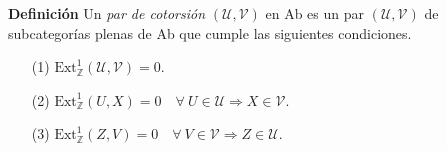 \documentclass[preview]{standalone}
\begin{document}
\begin{center}
\justifying \textbf{Definición} Un \emph{par de cotorsión} $(\mathcal{U}, \mathcal{V})$ en Ab es un par $(\mathcal{U}, \mathcal{V})$ de subcategorías plenas de Ab que cumple las siguientes condiciones.\begin{enumerate} \item[(1)] $\text{Ext}^1_\mathbb{Z} (\mathcal{U}, \mathcal{V}) = 0$. \item[(2)] $\text{Ext}^1_\mathbb{Z} (U, X) = 0 \quad \forall \ U\in\mathcal{U} \Rightarrow X\in\mathcal{V}$. \item[(3)] $\text{Ext}^1_\mathbb{Z} (Z, V) = 0 \quad \forall \ V\in\mathcal{V} \Rightarrow Z\in\mathcal{U}$. \end{enumerate}
\end{center}
\end{document}

